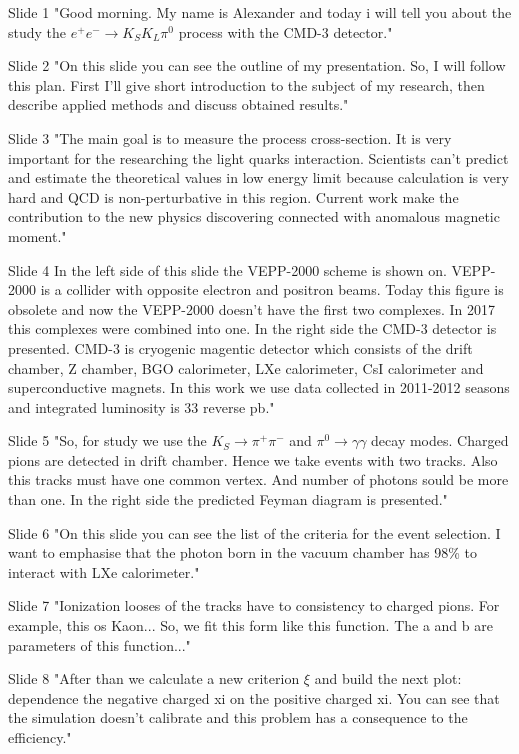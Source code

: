 Slide 1
    "Good morning. My name is Alexander and today i will tell you about the study the $e^{+}e^{-} \to K_{S}K_{L}\pi^{0}$ process with the CMD-3 detector."
    
Slide 2
    "On this slide you can see the outline of my presentation. So, I will follow this plan. First I'll give short introduction to the subject of my research, then describe applied methods and discuss obtained results."
    
Slide 3
    "The main goal is to measure the process cross-section. It is very important for the researching the light quarks interaction. Scientists can't predict and estimate the theoretical values in low energy limit because calculation is very hard and QCD is non-perturbative in this region. Current work make the contribution to the new physics discovering connected with anomalous magnetic moment."
    
Slide 4
    In the left side of this slide the VEPP-2000 scheme is shown on. VEPP-2000 is a collider with opposite electron and positron beams. Today this figure is obsolete and now the VEPP-2000 doesn't have the first two complexes. In 2017 this complexes were combined into one.
    In the right side the CMD-3 detector is presented. CMD-3 is cryogenic magentic detector which consists of the drift chamber, Z chamber, BGO calorimeter, LXe calorimeter, CsI calorimeter and superconductive magnets.
    In this work we use data collected in 2011-2012 seasons and integrated luminosity is 33 reverse pb."
    
Slide 5
    "So, for study we use the $K_{S} \to \pi^{+} \pi^{-}$ and $\pi^{0} \to \gamma \gamma$ decay modes. Charged pions are detected in drift chamber. Hence we take events with two tracks. Also this tracks must have one common vertex. And number of photons sould be more than one. In the right side the predicted Feyman diagram is presented."
    
Slide 6
    "On this slide you can see the list of the criteria for the event selection. I want to emphasise that the photon born in the vacuum chamber has 98\% to interact with LXe calorimeter." 
    
Slide 7
    "Ionization looses of the tracks have to consistency to charged pions. For example, this os Kaon... So, we fit this form like this function. The a and b are parameters of this function..."
    
Slide 8
    "After than we calculate a new criterion $\xi$ and build the next plot: dependence the negative charged xi on the positive charged xi. You can see that the simulation doesn't calibrate and this problem has a consequence to the efficiency."
    
